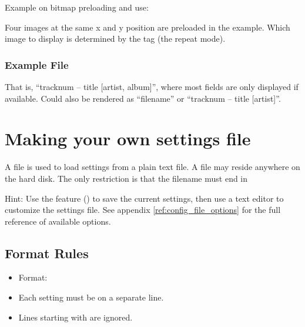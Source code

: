 Example on bitmap preloading and use:
\begin{example}
\end{example}
Four images at the same x and y position are preloaded in the example. Which 
image to display is determined by the  tag (the repeat mode).

\subsubsection{Example File}
\begin{example}
\end{example}
That is, ``tracknum -- title [artist, album]'', where most fields are only
displayed if available. Could also be rendered as ``filename'' or ``tracknum --
title [artist]''.

%  

\section{\label{ref:SettingsFile}Making your own settings file}
A  file is used to load settings from a plain text file. A 
 file may reside anywhere on the hard disk. The only restriction is
that the filename must end in 

Hint: Use the  feature () to save the current settings, then use a text editor to
customize the settings file. See appendix \ref{ref:config_file_options} 
for the full reference of available options.

\subsection{Format Rules}

\begin{itemize}
\item Format: 
\item Each setting must be on a separate line.
\item Lines starting with \config{\#} are ignored.
\end{itemize}

